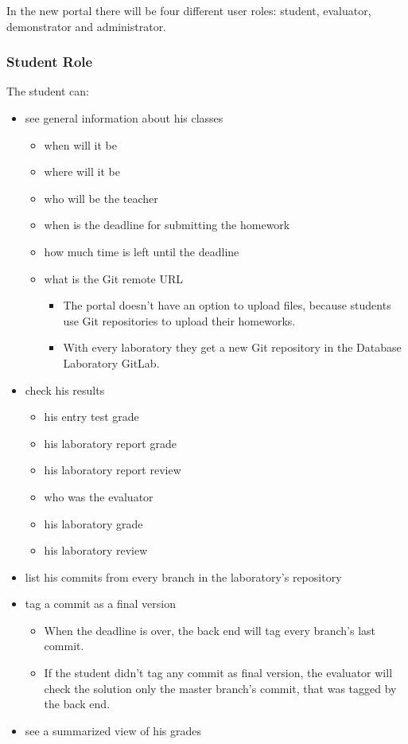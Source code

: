 In the new portal there will be four different user roles: student, evaluator, demonstrator and administrator. 

\subsubsection{Student Role}

The student can:

\begin{itemize}
	\item see general information about his classes
	\begin{itemize}
		\item when will it be
		\item where will it be
		\item who will be the teacher
		\item when is the deadline for submitting the homework
		\item how much time is left until the deadline
		\item what is the Git remote URL
		\begin{itemize}
			\item The portal doesn't have an option to upload files, because students use Git repositories to upload their homeworks.
			\item With every laboratory they get a new Git repository in the Database Laboratory GitLab.
		\end{itemize}
	\end{itemize}
	\item check his results
	\begin{itemize}
		\item his entry test grade
		\item his laboratory report grade
		\item his laboratory report review
		\item who was the evaluator
		\item his laboratory grade
		\item his laboratory review
	\end{itemize}
	\item list his commits from every branch in the laboratory's repository
	\item tag a commit as a final version
	\begin{itemize}
		\item When the deadline is over, the back end will tag every branch's last commit.
		\item If the student didn't tag any commit as final version, the evaluator will check the solution only the master branch's commit, that was tagged by the back end.
	\end{itemize}
	\item see a summarized view of his grades
\end{itemize}

